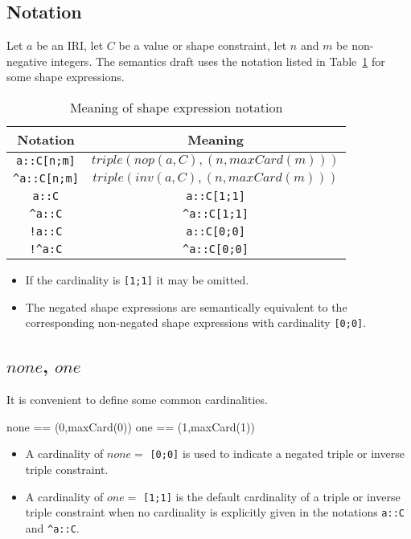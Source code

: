 \documentclass{article}
\begin{document}
\subsection{Notation}
Let $a$ be an IRI, let $C$ be a value or shape constraint, let $n$ and $m$ be non-negative integers.
The semantics draft uses the notation listed in Table~\ref{notation-meaning} for some shape expressions.

\begin{table}[h]
\begin{center}
\begin{tabular}{|c|c|}
\hline
Notation				& Meaning \\
\hline
{\tt a::C[n;m]}			& $triple(nop(a,C),(n,maxCard(m)))$\\
{\tt \verb+^+a::C[n;m]}	& $triple(inv(a,C),(n,maxCard(m)))$ \\
\hline
{\tt a::C}				& {\tt a::C[1;1]}\\
{\tt \verb+^+a::C}		& {\tt \verb+^+a::C[1;1]} \\
\hline
{\tt !a::C}				& {\tt a::C[0;0]} \\
{\tt !\verb+^+a:C}		& {\tt \verb+^+a::C[0;0]} \\
\hline
\end{tabular}
\end{center}
\caption{Meaning of shape expression notation}
\label{notation-meaning}
\end{table}
\begin{itemize}
\item If the cardinality is {\tt [1;1]} it may be omitted.
\item The negated shape expressions are semantically equivalent to the corresponding non-negated shape expressions with cardinality {\tt [0;0]}.
\end{itemize}

\subsection{$none$, $one$}
It is convenient to define some common cardinalities.
\begin{zed}
	none == (0,maxCard(0))
\also
	one == (1,maxCard(1))
\end{zed}
\begin{itemize}
\item A cardinality of $none =$ {\tt [0;0]} is used to indicate a negated triple or inverse triple constraint.
\item A cardinality of $one =$ {\tt [1;1]} is the default cardinality of a triple or inverse triple constraint
when no cardinality is explicitly given in the notations {\tt a::C} and {\tt \verb+^+a::C}.
\end{itemize}
\end{document}
